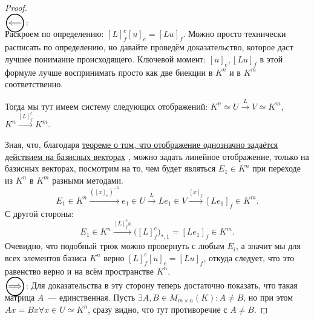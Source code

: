 \begin{proof}\leavevmode\\
    $\ola$:\\
    Раскроем по определению: $[L]^e_f[u]_e=[Lu]_f$.
    Можно просто технически расписать по определению, но давайте проведём доказательство,
    которое даст лучшее понимание происходящего. Ключевой момент: $[u]_e, [Lu]_f$ в этой
    формуле лучше воспринимать просто как две биекции в $K^n$ и в $K^m$ соответственно.

    Тогда мы тут имеем систему следующих отображений:
    $K^n \simeq U \xrightarrow{L} V \simeq K^m$,
    $K^n\xrightarrow{[L]^e_f} K^m$.

    Зная, что, благодаря 
    \hyperref[thm:Линейное отображение определяется действием на базисных векторах]
    {теореме о том, что отображение однозначно задаётся действием на базисных векторах}
    , можно задать линейное отображение, только на базисных векторах, посмотрим на то, чем
    будет являться $E_1\in K^n$ при переходе из $K^n$ в $K^m$ разными методами.
    \[
        E_1\in K^n \xrightarrow{([x]_e)^{-1}} e_1 \in U \xrightarrow{L} Le_1 \in V
        \xrightarrow{[x]_f} [Le_1]_f\in K^m
    .\]
    С другой стороны:
    \[
        E_1\in K^n\xrightarrow{[L]^e_fx} \Big([L]^e_f\Big)_{*, 1} = [Le_1]_f\in K^m
    .\] 
    Очевидно, что подобный трюк можно провернуть с любым $E_i$, а значит мы для всех
    элементов базиса $K^n$ верно $[L]^e_f[u]_e=[Lu]_f$, откуда следует, что это равенство
    верно и на всём пространстве $K^n$.\\
    $\ora$:
    Для доказательства в эту сторону теперь достаточно показать, что такая матрица $A$~---
    единственная. Пусть $\exists A,B\in M_{m\times n}(K)\colon A \not = B$, но при этом 
    $Ax = Bx \forall x\in U\simeq K^n$, сразу видно, что тут противоречие с $A\not=B$.
\end{proof}
